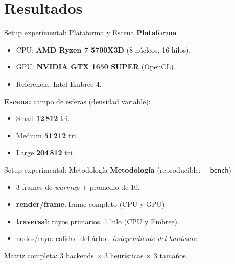 \documentclass[aspectratio=169,11pt]{beamer}
\newcommand{\hl}[1]{{\color{primdk}\textbf{#1}}}
\begin{document}
\section{Resultados}

\begin{frame}{Setup experimental: Plataforma y Escena}
\textbf{Plataforma}
\begin{itemize}
  \item CPU: \hl{AMD Ryzen 7 5700X3D} (8 n\'ucleos, 16 hilos).
  \item GPU: \hl{NVIDIA GTX 1650 SUPER} (OpenCL).
  \item Referencia: \alert{Intel Embree 4}.
\end{itemize}

\vspace{1.5em}

\textbf{Escena:} campo de esferas (densidad variable):
\begin{itemize}
  \item Small \hl{12\,812} tri.
  \item Medium \hl{51\,212} tri.
  \item Large \hl{204\,812} tri.
\end{itemize}
\end{frame}

\begin{frame}{Setup experimental: Metodolog\'ia}
\textbf{Metodolog\'ia} (reproducible: \texttt{-{}-bench})
\begin{itemize}
  \item 3 frames de \emph{warmup} $+$ promedio de 10.
  \item \hl{render/frame}: frame completo (CPU y GPU).
  \item \hl{traversal}: rayos primarios, 1 hilo (CPU y Embree).
  \item \alert{nodos/rayo}: calidad del \'arbol, \emph{independiente del hardware}.
\end{itemize}
\vspace{1.5em}
\centering\footnotesize\textcolor{mute}{Matriz completa: 3 backends $\times$ 3 heur\'isticas $\times$ 3 tama\~nos.}
\end{frame}
\end{document}
